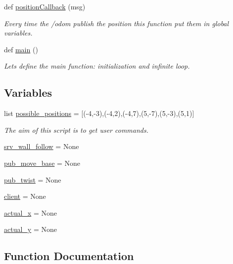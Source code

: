 \begin{DoxyCompactItemize}
def \hyperlink{namespaceinterface_a1b788c3588460b432a0ecf905def2092}{position\+Callback} (msg)
\begin{DoxyCompactList}\small\item\em Every time the \textquotesingle{}/odom\textquotesingle{} publish the position this function put them in global variables. \end{DoxyCompactList}\item 
def \hyperlink{namespaceinterface_ac84656acec70183a4ef276f4a3343971}{main} ()
\begin{DoxyCompactList}\small\item\em Let\textquotesingle{}s define the main function\+: initialization and infinite loop. \end{DoxyCompactList}\end{DoxyCompactItemize}
\subsection*{Variables}
\begin{DoxyCompactItemize}
\item 
list \hyperlink{namespaceinterface_a77dace02a869e1f2eab3089d30819e9e}{possible\+\_\+positions} = \mbox{[}(-\/4,-\/3),(-\/4,2),(-\/4,7),(5,-\/7),(5,-\/3),(5,1)\mbox{]}
\begin{DoxyCompactList}\small\item\em The aim of this script is to get user commands. \end{DoxyCompactList}\item 
\hyperlink{namespaceinterface_a72ec0b767bae8bc1bf6b2da98c8b9737}{srv\+\_\+wall\+\_\+follow} = None
\item 
\hyperlink{namespaceinterface_a295379ed3912c49d4fd9d286c7f0caee}{pub\+\_\+move\+\_\+base} = None
\item 
\hyperlink{namespaceinterface_a955722b54659175cc5ea2543c976d6a4}{pub\+\_\+twist} = None
\item 
\hyperlink{namespaceinterface_a2dc19bae4560767a9cff309d17ca0fc3}{client} = None
\item 
\hyperlink{namespaceinterface_a4fa46e1dde3c61a732b5383c93e411e1}{actual\+\_\+x} = None
\item 
\hyperlink{namespaceinterface_af27b0b163a429bf0725f6c471e3f1998}{actual\+\_\+y} = None
\end{DoxyCompactItemize}


\subsection{Function Documentation}
\mbox{\label{namespaceinterface_a1ba6fd083749b1aa01d230719ebffaf8}} 
